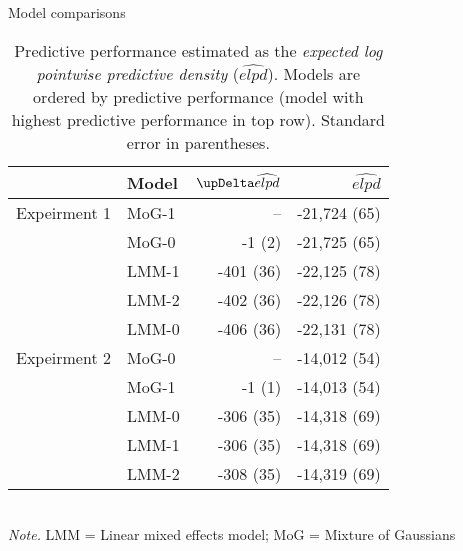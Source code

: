 \begin{frame}{Model comparisons}
\begin{scriptsize}
\begin{table}[ht]
\centering
	\caption{\scriptsize{Predictive performance estimated as the \textit{expected log pointwise predictive density} ($\widehat{elpd}$). Models are ordered by predictive performance (model with highest predictive performance in top row)}. Standard error in parentheses.}
\begin{tabular}{rlrr}
  \toprule
 & Model & $\updel\widehat{elpd}$ & $\widehat{elpd}$ \\ 
  \midrule
  \rowcolor{yellow!40!white}Expeirment 1 & MoG-1 & -- & -21,724 (65) \\ 
  & MoG-0 & -1 (2) & -21,725 (65) \\ 
  \rowcolor{yellow!40!white}& LMM-1 & -401 (36) & -22,125 (78) \\ 
  & LMM-2 & -402 (36) & -22,126 (78) \\ 
  & LMM-0 & -406 (36) & -22,131 (78) \\ 
   \midrule
    Expeirment 2 & MoG-0 & -- & -14,012 (54) \\ 
   \rowcolor{yellow!40!white}& MoG-1 & -1 (1) & -14,013 (54) \\ 
   & LMM-0 & -306 (35) & -14,318 (69) \\ 
   \rowcolor{yellow!40!white}& LMM-1 & -306 (35) & -14,318 (69) \\ 
   & LMM-2 & -308 (35) & -14,319 (69) \\ 

		\bottomrule
		\end{tabular}\\
		\textit{Note.} LMM = Linear mixed effects model; MoG = Mixture of Gaussians 
		\end{table}
\end{scriptsize}
\end{frame}